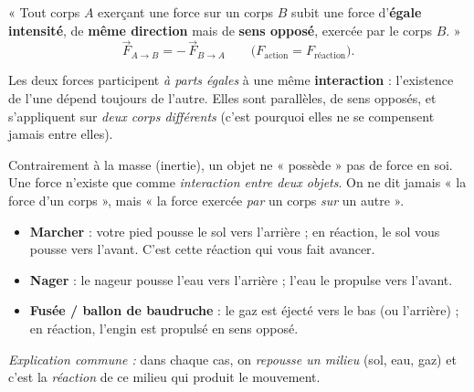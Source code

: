 \documentclass[11pt,a4paper]{article}
\newcommand{\vv}[1]{\vec{#1}}
\begin{document}
\begin{theoreme}
« Tout corps $A$ exerçant une force sur un corps $B$ subit une force d'\textbf{égale intensité}, de
\textbf{même direction} mais de \textbf{sens opposé}, exercée par le corps $B$. »
\[ \vv F_{A\to B}=-\,\vv F_{B\to A}\qquad\bigl(F_{\text{action}}=F_{\text{réaction}}\bigr). \]
\end{theoreme}

\noindent Les deux forces participent \emph{à parts égales} à une même \textbf{interaction} :
l'existence de l'une dépend toujours de l'autre. Elles sont parallèles, de sens opposés, et
s'appliquent sur \emph{deux corps différents} (c'est pourquoi elles ne se compensent jamais entre elles).

\begin{center}
\end{center}

\begin{attention}
Contrairement à la masse (inertie), un objet ne « possède » pas de force en soi. Une force
n'existe que comme \emph{interaction entre deux objets}. On ne dit jamais « la force d'un corps »,
mais « la force exercée \emph{par} un corps \emph{sur} un autre ».
\end{attention}

\begin{exemple}
\begin{itemize}[leftmargin=1.6em,topsep=2pt,itemsep=1pt]
  \item \textbf{Marcher} : votre pied pousse le sol vers l'arrière ; en réaction, le sol vous pousse vers l'avant. C'est cette réaction qui vous fait avancer.
  \item \textbf{Nager} : le nageur pousse l'eau vers l'arrière ; l'eau le propulse vers l'avant.
  \item \textbf{Fusée / ballon de baudruche} : le gaz est éjecté vers le bas (ou l'arrière) ; en réaction, l'engin est propulsé en sens opposé.
\end{itemize}
\emph{Explication commune :} dans chaque cas, on \emph{repousse un milieu} (sol, eau, gaz) et c'est
la \emph{réaction} de ce milieu qui produit le mouvement.
\end{exemple}
\end{document}
